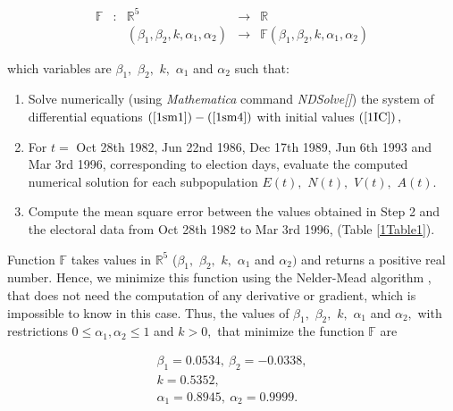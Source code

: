 \[
\begin{array}{ccccc}
\mathbb{F} & : & \mathbb{R}^{5} & \longrightarrow & \mathbb{R} \\ 
&  & \left( \beta _{1},\beta _{2},k,\alpha _{1},\alpha _{2}\right) & 
\longrightarrow & \mathbb{F}\left( \beta _{1},\beta _{2},k,\alpha
_{1},\alpha _{2}\right)
\end{array}
\]

which variables are $\beta _{1},$ $\beta _{2},$ $k,$ $\alpha _{1}$ and 
$\alpha _{2}$ such that:

\begin{enumerate}
\item Solve numerically (using \textit{Mathematica} command \emph{NDSolve[]}) the system of differential
equations $\left( \ref{1sm1}\right) -\left( \ref{1sm4}\right) $ with initial
values $\left( \ref{1IC}\right),$

\item For $t=$ Oct 28th 1982, Jun 22nd 1986, Dec 17th 1989, Jun 6th 1993 and
Mar 3rd 1996, corresponding to election days, evaluate the computed
numerical solution for each subpopulation $E\left( t\right) ,$ $N\left(
t\right) ,$ $V\left( t\right) ,$ $A\left( t\right) $.

\item Compute the mean square error between the values obtained in Step 2
and the electoral data from Oct 28th 1982 to Mar 3rd 1996, (Table 
\ref{1Table1}).
\end{enumerate}

Function $\mathbb{F}$ takes values in $\mathbb{R}^{5}$ ($\beta _{1},$ 
$\beta_{2},$ $k,$ $\alpha _{1}$ and $\alpha _{2})$ and returns a positive real
number. Hence, we minimize this function using the Nelder-Mead
algorithm \cite{Nelder, Press}, that does not need the computation of
any derivative or gradient, which is impossible to know in this case. Thus, the values of $\beta _{1},$ $\beta _{2},$ $k,$ 
$\alpha _{1}$ and $\alpha _{2},$ with restrictions $0\leq \alpha _{1},\alpha_{2}\leq 1$ and $k>0,$ that minimize the function $\mathbb{F}$ are

\begin{equation}
\begin{array}{l}
\beta_{1}=0.0534,\ \beta_{2}=-0.0338,\\
 k=0.5352,\\
\alpha_{1}=0.8945,\ \alpha_{2}=0.9999.  
\end{array}
\label{1parametros}
\end{equation}

